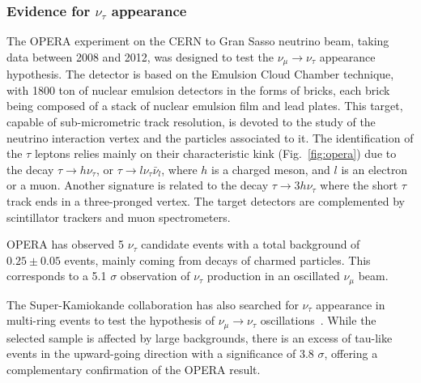  
 \subsubsection{Evidence for $\nu_\tau$ appearance}

The OPERA experiment on the CERN to Gran Sasso neutrino beam, taking data between 2008 and 2012, was designed to test the $\nu_\mu \rightarrow \nu_\tau$ appearance hypothesis. The detector is based on the Emulsion Cloud Chamber technique, with 1800 ton of nuclear emulsion detectors in the forms of bricks, each brick being composed of a stack of nuclear emulsion film and lead plates. This target, capable of sub-micrometric track resolution, is devoted to the study of the neutrino interaction vertex and the particles associated to it. The identification of the $\tau$ leptons relies mainly on their characteristic kink (Fig.~\ref{fig:opera}) due to the decay $\tau \rightarrow h \nu_\tau$, or $\tau \rightarrow l \nu_\tau \bar \nu_l$, where $h$ is a charged meson, and $l$ is an electron or a muon. Another signature is related to the decay $\tau \rightarrow 3 h \nu_\tau$ where the short $\tau$ track ends in a three-pronged vertex. The target detectors are complemented by scintillator trackers and muon spectrometers. 

OPERA has observed 5 $\nu_\tau$ candidate events \cite{Agafonova:2015jxn} with a total background of 
$0.25 \pm 0.05$ events, mainly coming from decays of charmed particles. This corresponds to a 5.1 $\sigma$ observation of $\nu_\tau$ production in an oscillated $\nu_\mu$ beam. 

The Super-Kamiokande collaboration has also searched for $\nu_\tau$ appearance in multi-ring events to test the hypothesis of $\nu_\mu \rightarrow \nu_\tau$ oscillations~\cite{Abe:2012jj}. While the selected sample is affected by large backgrounds, there is an excess of tau-like events in the upward-going direction with a significance of 3.8 $\sigma$, offering a complementary confirmation of the OPERA result.  
 
